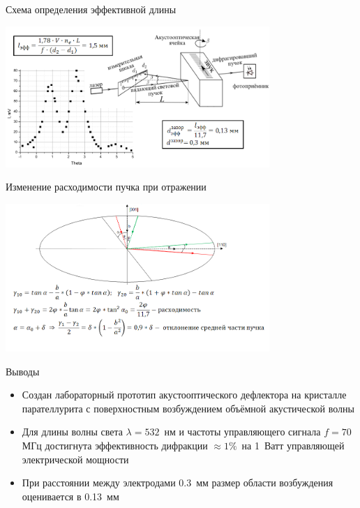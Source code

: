 \documentclass[ignorenonframetext,hyperref={pdftex,unicode}]{beamer}
\begin{document}
%
\begin{frame}{Схема определения эффективной длины}
  \begin{center}
    \includegraphics[width=10cm]{pictures/leff.png}
  \end{center}
\end{frame}
%
\begin{frame}{Изменение расходимости пучка при отражении}
  \begin{center}
    \includegraphics[width=10cm]{pictures/diverg.png}
  \end{center}
\end{frame}
%
\begin{frame}{Выводы}
  \begin{itemize}
  \item Создан лабораторный прототип акустооптического дефлектора на кристалле парателлурита с поверхностным возбуждением объёмной акустической волны
  \item Для длины волны света \(\lambda=532\)~нм и частоты управляющего сигнала \(f=70\)МГц достигнута эффективность дифракции \(\approx1\%\)~на 1~Ватт управляющей электрической мощности 
    \item При расстоянии между электродами 0.3~мм размер области возбуждения оценивается в 0.13~мм
  \end{itemize}
\end{frame}
%
\end{document}
